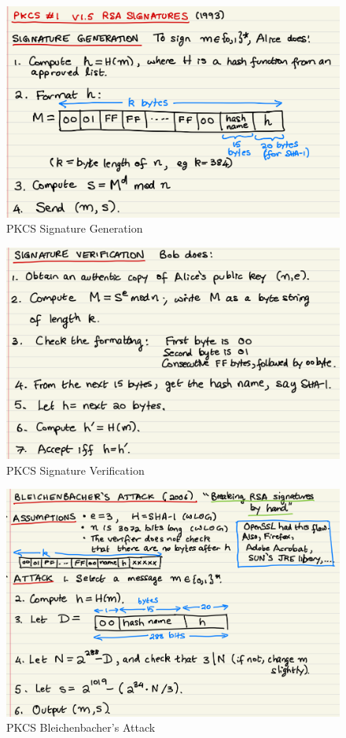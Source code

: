 \documentclass[12pt,titlepage]{article}
\begin{document}
\begin{center}
	\begin{figure}[h!]
		\centering
		\includegraphics[width=.9\textwidth]{PKCS_Signature_Generation.png}
		\caption{PKCS Signature Generation}
	\end{figure}
\end{center}

\begin{center}
	\begin{figure}[h!]
		\centering
		\includegraphics[width=.9\textwidth]{PKCS_Signature_Verification.png}
		\caption{PKCS Signature Verification}
	\end{figure}
\end{center}

\begin{center}
	\begin{figure}[h!]
		\centering
		\includegraphics[width=.9\textwidth]{PKCS_Bleichenbacher's_Attack.png}
		\caption{PKCS Bleichenbacher's Attack}
	\end{figure}
\end{center}
\end{document}
